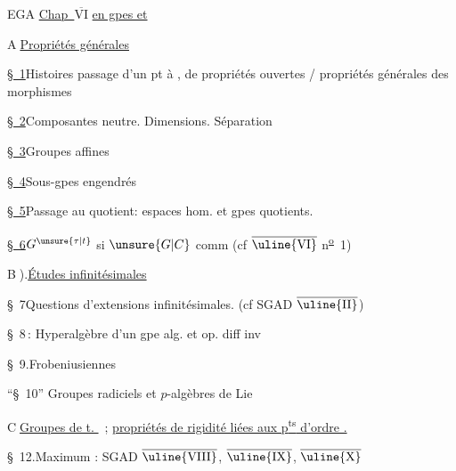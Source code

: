 \noindent EGA \uline{Chap\ $\overline{\mathrm{VI}}$}\qquad
\uline{ en gpes et }

\noindent\textcircled{A}\quad \uline{Propriétés générales}

\noindent\uline{\S~1}\quad Histoires  passage d'un pt à , de propriétés ouvertes / propriétés générales des morphismes

\noindent\uline{\S~2}\quad Composantes neutre. Dimensions. Séparation

\noindent\uline{\S~3}\quad Groupes affines

\reversemarginpar
\noindent{}\uline{\S~4}\quad Sous-gpes engendrés
\normalmarginpar

\noindent\uline{\S~5}\quad Passage au quotient: espaces hom. et gpes quotients.

\noindent\uline{\S~6}\quad $G^{\unsure{\tau|t}}$ si $\unsure{G|C}$ comm (cf  $\overline{\text{\uline{VI}}}$ n\textsuperscript{\uline{o}}~1)

\noindent\textcircled{B}).\quad \uline{Études infinitésimales}

\noindent\S~7\quad Questions d'extensions infinitésimales. (cf SGAD $\overline{\text{\uline{II}}}$)

\noindent\S~8\,: \quad Hyperalgèbre d'un gpe alg. et op. diff inv

\noindent\S~9.\quad Frobeniusiennes

\noindent``\S~10''\quad {} Groupes radiciels et $p$-algèbres de Lie

\noindent{}

\noindent{}

\noindent\textcircled{C}\quad \uline{Groupes de t. }\ ; \uline{propriétés de rigidité liées aux p\textsuperscript{ts} d'ordre .}

\noindent\S~12.\quad Maximum : SGAD $\overline{\text{\uline{VIII}}}$, $\overline{\text{\uline{IX}}}$, $\overline{\text{\uline{X}}}$

\clearpage
